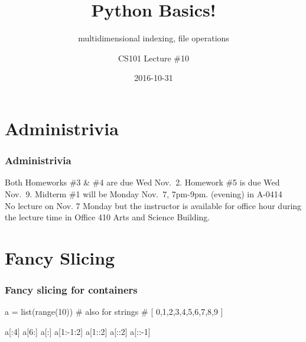 \documentclass[11pt]{beamer}
\title{Python Basics!}
\subtitle{multidimensional indexing, file operations}
\author{CS101 Lecture \#10}
\date{2016-10-31}
\begin{document}
  \setcounter{showProgressBar}{0}
  \setcounter{showSlideNumbers}{0}

\frame{\titlepage}

\setcounter{framenumber}{0}
\setcounter{showProgressBar}{1}
\setcounter{showSlideNumbers}{1}


\section{Administrivia}

\begin{frame}
	\frametitle{Administrivia}
	\Enlarge
	\begin{itemize}
		\myitem  Both Homeworks \#3 \& \#4 are due Wed Nov.\ 2.
		\myitem  Homework \#5 is due Wed Nov.\ 9.
		\myitem  Midterm \#1 will be Monday Nov.\ 7, 7pm-9pm.  (evening) in A-0414\\ \textcolor{CS101GradBot}{No lecture on Nov. 7 Monday but the instructor is available for office hour during the lecture time in Office 410 Arts and Science Building.}
	\end{itemize}
\end{frame}


\section{Fancy Slicing}

\begin{frame}[fragile]
  \frametitle{Fancy slicing for containers}
  \Enlarge

  \begin{semiverbatim}
a = list(range(10))  # also for strings %
#   [ 0,1,2,3,4,5,6,7,8,9 ] %

a[:4]      %
a[6:]      %
a[:]       %
a[1:-1:2]  %
a[1::2]    %
a[::2]     %
a[::-1]    %
  \end{semiverbatim}
\end{frame}
\end{document}
